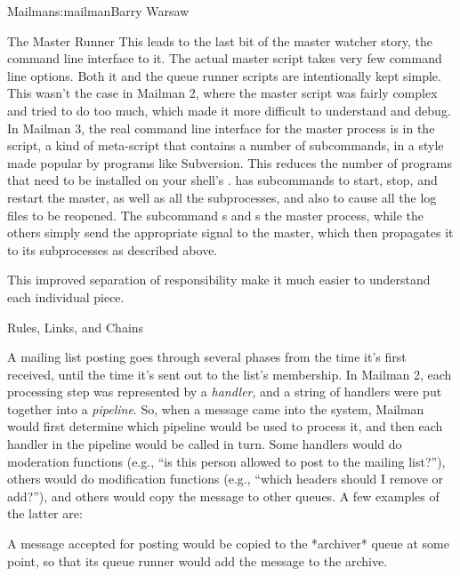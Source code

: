 \begin{aosachapter}{Mailman}{s:mailman}{Barry Warsaw}
\begin{aosasect1}{The Master Runner}
This leads to the last bit of the master watcher story, the command
line interface to it.  The actual master script takes very few command
line options.  Both it and the queue runner scripts are intentionally
kept simple.  This wasn't the case in Mailman 2, where the master
script was fairly complex and tried to do too much, which made it more
difficult to understand and debug.  In Mailman 3, the real command
line interface for the master process is in the 
script, a kind of meta-script that contains a number of subcommands,
in a style made popular by programs like Subversion.  This reduces the
number of programs that need to be installed on your shell's
.   has subcommands to start, stop, and
restart the master, as well as all the subprocesses, and also to cause
all the log files to be reopened.  The  subcommand
s and s the master process, while the others
simply send the appropriate signal to the master, which then
propagates it to its subprocesses as described above.

This improved separation of responsibility make it much easier to
understand each individual piece.

\end{aosasect1}

\begin{aosasect1}{Rules, Links, and Chains}

A mailing list posting goes through several phases from the time it's
first received, until the time it's sent out to the list's membership.
In Mailman 2, each processing step was represented by a
\emph{handler}, and a string of handlers were put together into a
\emph{pipeline}.  So, when a message came into the system, Mailman
would first determine which pipeline would be used to process it, and
then each handler in the pipeline would be called in turn.  Some
handlers would do moderation functions (e.g., ``is this person allowed
to post to the mailing list?''), others would do modification
functions (e.g., ``which headers should I remove or add?''), and
others would copy the message to other queues.  A few examples of the
latter are:

\begin{aosaitemize}

\item A message accepted for posting would be copied to the *archiver*
  queue at some point, so that its queue runner would add the message
  to the archive.


\end{aosaitemize}
\end{aosasect1}
\end{aosachapter}
